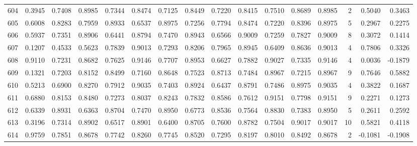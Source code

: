 \begin{tabular}{lrrrrrrrrrrrrrrr}
604 &      0.3945 &  0.7408 &  0.8985 &  0.7344 &  0.8474 &  0.7125 &  0.8449 &  0.7220 &  0.8415 &  0.7510 &   0.8689 &     0.8985 &      2 &                    0.5040 &                     0.3463 \\
605 &      0.6008 &  0.8283 &  0.7959 &  0.8933 &  0.6537 &  0.8975 &  0.7256 &  0.7794 &  0.8474 &  0.7220 &   0.8396 &     0.8975 &      5 &                    0.2967 &                     0.2275 \\
606 &      0.5937 &  0.7351 &  0.8906 &  0.6441 &  0.8794 &  0.7470 &  0.8943 &  0.6566 &  0.9009 &  0.7259 &   0.7827 &     0.9009 &      8 &                    0.3072 &                     0.1414 \\
607 &      0.1207 &  0.4533 &  0.5623 &  0.7839 &  0.9013 &  0.7293 &  0.8206 &  0.7965 &  0.8945 &  0.6409 &   0.8636 &     0.9013 &      4 &                    0.7806 &                     0.3326 \\
608 &      0.9110 &  0.7231 &  0.8682 &  0.7625 &  0.9146 &  0.7707 &  0.8953 &  0.6627 &  0.7882 &  0.9027 &   0.7335 &     0.9146 &      4 &                    0.0036 &                    -0.1879 \\
609 &      0.1321 &  0.7203 &  0.8152 &  0.8499 &  0.7160 &  0.8648 &  0.7523 &  0.8713 &  0.7484 &  0.8967 &   0.7215 &     0.8967 &      9 &                    0.7646 &                     0.5882 \\
610 &      0.5213 &  0.6900 &  0.8270 &  0.7912 &  0.9035 &  0.7403 &  0.8924 &  0.6437 &  0.8791 &  0.7486 &   0.8975 &     0.9035 &      4 &                    0.3822 &                     0.1687 \\
611 &      0.6880 &  0.8153 &  0.8480 &  0.7273 &  0.8037 &  0.8243 &  0.7832 &  0.8586 &  0.7612 &  0.9151 &   0.7798 &     0.9151 &      9 &                    0.2271 &                     0.1273 \\
612 &      0.6339 &  0.8931 &  0.6363 &  0.8704 &  0.7470 &  0.8950 &  0.6773 &  0.8536 &  0.7564 &  0.8830 &   0.7383 &     0.8950 &      5 &                    0.2611 &                     0.2592 \\
613 &      0.3196 &  0.7314 &  0.8902 &  0.6517 &  0.8901 &  0.6400 &  0.8705 &  0.7600 &  0.8782 &  0.7504 &   0.9017 &     0.9017 &     10 &                    0.5821 &                     0.4118 \\
614 &      0.9759 &  0.7851 &  0.8678 &  0.7742 &  0.8260 &  0.7745 &  0.8520 &  0.7295 &  0.8197 &  0.8010 &   0.8492 &     0.8678 &      2 &                   -0.1081 &                    -0.1908 \\

\end{tabular}

